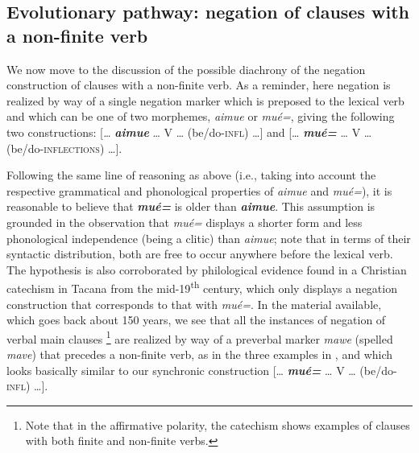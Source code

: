 \documentclass[output=paper]{langsci/langscibook}
\begin{document}
\subsection{Evolutionary pathway: negation of clauses with a non-finite
verb}\label{sec:tacana-10.2}

We now move to the discussion of the possible diachrony of the negation construction of clauses with a non-finite verb. As a reminder, here negation is realized by way of a single negation marker which is preposed to the lexical verb and which can be one of two morphemes, \textit{aimue} or \textit{mué=}, giving the following two constructions: [\textit{…} \textbf{\textit{aimue}} … V … (be/do-\textsc{infl}) …] and [… \textbf{\textit{mué=}} … V … (be/do-\textsc{inflections}) …].

Following the same line of reasoning as above (i.e., taking into account
the respective grammatical and phonological properties of \textit{aimue}
and \textit{mué=}), it is reasonable to believe that \textbf{\textit{mué=}}
is older than \textbf{\textit{aimue}}. This assumption is grounded in the
observation that \textit{mué=} displays a shorter form and less
phonological independence (being a clitic) than \textit{aimue}; note that
in terms of their syntactic distribution, both are free to occur anywhere
before the lexical verb. The hypothesis is also corroborated by
philological evidence found in a Christian catechism in Tacana from
the mid-19\textsuperscript{th} century, which only displays a negation construction that
corresponds to that with \textit{mué=}. In the material available, which
goes back about 150 years, we see that all the instances of negation
of verbal main clauses%
%
    \footnote{\label{fn:tacana-catechism} Note that in the affirmative polarity, the catechism shows
    examples of clauses with both finite and non-finite verbs.} 
%
are realized by way of a preverbal marker \textit{mawe} (spelled
\textit{mave}) that precedes a non-finite verb, as in the three examples in
, and which looks basically similar to our synchronic construction [… \textbf{\textit{mué=}} … V … (be/do-\textsc{infl}) …].
%
\end{document}
